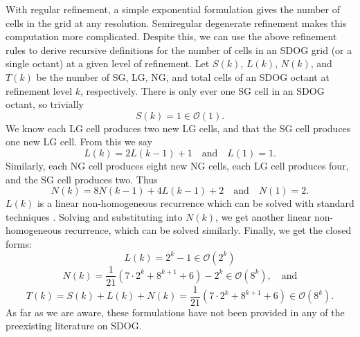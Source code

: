 With regular refinement, a simple exponential formulation gives the number of cells in the grid at any resolution.
Semiregular degenerate refinement makes this computation more complicated.
Despite this, we can use the above refinement rules to derive recursive definitions for the number of cells in an SDOG grid (or a single octant) at a given level of refinement.
Let $S(k)$, $L(k)$, $N(k)$, and $T(k)$ be the number of SG, LG, NG, and total cells of an SDOG octant at refinement level $k$, respectively.
There is only ever one SG cell in an SDOG octant, so trivially
%
\begin{equation*}
S(k) = 1 \in \mathcal{O}(1).
\end{equation*}
%
We know each LG cell produces two new LG cells, and that the SG cell produces one new LG cell.
From this we say
%
\begin{equation*}
L(k) = 2L(k-1) + 1 \quad\text{and}\quad L(1) = 1.
\end{equation*}
%
Similarly, each NG cell produces eight new NG cells, each LG cell produces four, and the SG cell produces two.
Thus
%
\begin{equation*}
N(k) = 8N(k-1) + 4L(k-1) + 2 \quad\text{and}\quad N(1) = 2.
\end{equation*}
%
$L(k)$ is a linear non-homogeneous recurrence which can be solved with standard techniques \cite{bellman1963differential}.
Solving and substituting into $N(k)$, we get another linear non-homogeneous recurrence, which can be solved similarly.
Finally, we get the closed forms:
%
\begin{equation*}
L(k) = 2^{k} - 1 \in \mathcal{O}(2^k)
\end{equation*}
%
\begin{equation*}
N(k) = \frac{1}{21} \left( 7 \cdot 2^{k} + 8^{k+1} + 6 \right) - 2^{k} \in \mathcal{O}(8^k), \quad\text{and}
\end{equation*}
%
\begin{equation*}
T(k) = S(k) + L(k) + N(k) = \frac{1}{21} \left( 7 \cdot 2^{k} + 8^{k+1} + 6 \right) \in \mathcal{O}(8^k).
\end{equation*}
%
As far as we are aware, these formulations have not been provided in any of the preexisting literature on SDOG.


